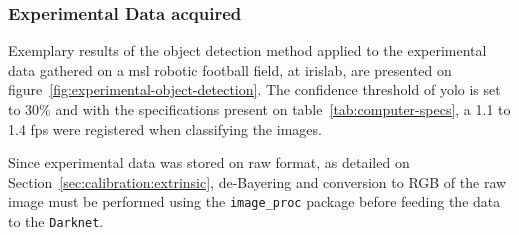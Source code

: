 \subsubsection{Experimental Data acquired}
Exemplary results of the object detection method applied to the experimental data gathered on a \ac{msl} robotic football field, at \acf{irislab}, are presented on figure~\ref{fig:experimental-object-detection}. The confidence threshold of \ac{yolo} is set to 30\% and with the specifications present on table~\ref{tab:computer-specs}, a 1.1 to 1.4 \ac{fps} were registered when classifying the images.

Since experimental data was stored on raw format, as detailed on Section~\ref{sec:calibration:extrinsic}, de-Bayering and conversion to RGB of the raw image must be performed using the \texttt{image\_proc} package before feeding the data to the \texttt{Darknet}.

